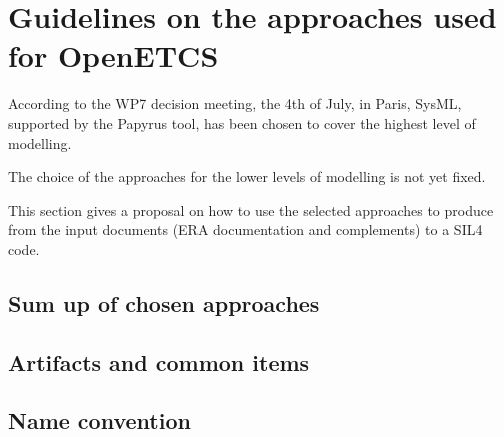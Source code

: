 
\section{Guidelines on the approaches used for OpenETCS}


\begin{comment}
This section will be written for the final version of the document, after the approach and tools tio  use during the project will be selected.
\end{comment}

According to  the WP7 decision meeting, the 4th of July, in Paris, SysML, supported by the Papyrus tool,  has been chosen to  cover the highest level of modelling.

The choice of the approaches for the lower levels of modelling is not yet fixed.

This section gives a proposal on how to use the selected approaches to produce from the input documents (ERA documentation and complements)  to a SIL4 code.

\subsection{Sum up of chosen approaches}
\begin{comment}
list of chosen approaches, and for which activities they are used
\end{comment}


\subsection{Artifacts and common items}

\subsection{Name convention}

